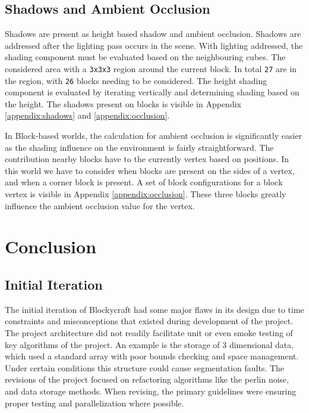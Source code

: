 \documentclass[a4paper,11pt,titlepage]{scrartcl}
\newcommand{\Blockycraft}{Blockycraft}
\begin{document}
\subsection{Shadows and Ambient Occlusion}
\label{section:shadows}
Shadows are present as height based shadow and ambient occlusion.  Shadows are addressed after the lighting pass occurs in the scene.  With lighting addressed, the shading component must be evaluated based on the neighbouring cubes.  The considered area with a \texttt{3x3x3} region around the current block.  In total \texttt{27} are in the region, with \texttt{26} blocks needing to be considered.  The height shading component is evaluated by iterating vertically and determining shading based on the height.  The shadows present on blocks is visible in Appendix \ref{appendix:shadows} and \ref{appendix:occlusion}.

In Block-based worlds, the calculation for ambient occlusion is significantly easier as the shading influence on the environment is fairly straightforward.  The contribution nearby blocks have to the currently vertex based on positions.  In this world we have to consider when blocks are present on the sides of a vertex, and when a corner block is present.  A set of block configurations for a block vertex is visible in Appendix \ref{appendix:occlusion}.  These three blocks greatly influence the ambient occlusion value for the vertex.


\section{Conclusion}
\subsection{Initial Iteration}
The initial iteration of \Blockycraft{} had some major flaws in its design due to time constraints and misconceptions that existed during development of the project.  The project architecture did not readily facilitate unit or even smoke testing of key algorithms of the project.  An example is the storage of 3 dimensional data, which used a standard array with poor bounds checking and space management.  Under certain conditions this structure could cause segmentation faults.   The revisions of the project focused on refactoring algorithms like the perlin noise, and data storage methods.  When revising, the primary guidelines were ensuring proper testing and parallelization where possible. 
\end{document}
